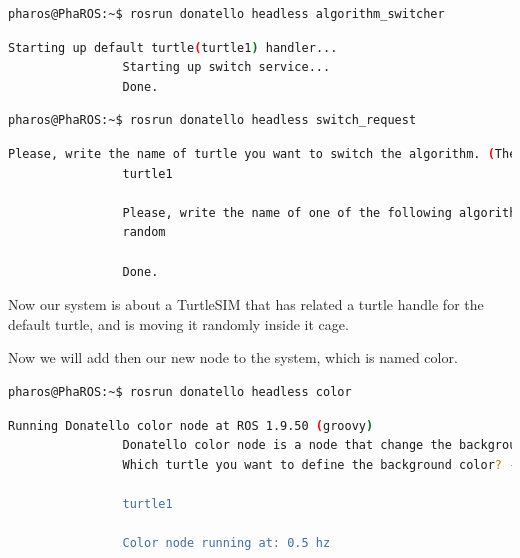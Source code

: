 \documentclass[a4paper,10pt,twoside]{book}
\begin{document}
			
			\begin{lstlisting}[language=bash,title={Starting up Donatello/AlgorithmSwitcher}]
				pharos@PhaROS:~$ rosrun donatello headless algorithm_switcher
			\end{lstlisting}
			
			\begin{lstlisting}[language=bash,title={Starting up Donatello/AlgorithmSwitcher - Output }]
				Starting up default turtle(turtle1) handler... 
				Starting up switch service... 
				Done.
			\end{lstlisting}

			
			\begin{lstlisting}[language=bash,title={Starting up Donatello/SwitchRequest}]
				pharos@PhaROS:~$ rosrun donatello headless switch_request
			\end{lstlisting}
			
			\begin{lstlisting}[language=bash,title={Starting up Donatello/SwitchRequest - Interactive Output }]
				Please, write the name of turtle you want to switch the algorithm. (The default one is called turtle1) 
				turtle1

				Please, write the name of one of the following algorithms  #('random' 'quiet' 'pursuiter' 'circular' 'pharo')
				random
				
				Done.
			\end{lstlisting}
			

			Now our system is about a TurtleSIM that has related a turtle handle for the default turtle, and is moving it randomly inside it cage. 
				
			Now we will add then our new node to the system, which is named color. 
			
			
			\begin{lstlisting}[language=bash,title={Starting up Donatello/Color}]
				pharos@PhaROS:~$ rosrun donatello headless color
			\end{lstlisting}
			
			
			\begin{lstlisting}[language=bash,title={Starting up Donatello/Color - Output}]
				 Running Donatello color node at ROS 1.9.50 (groovy)
				Donatello color node is a node that change the background color of the running TurtleSIM node with the behaviour of a turlte
				Which turtle you want to define the background color? - Remember default turtle's name is turtle1 

				turtle1

				Color node running at: 0.5 hz
			\end{lstlisting}
			
\end{document}

